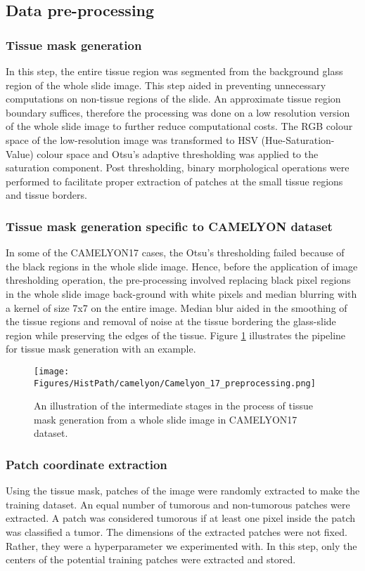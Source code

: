 \documentclass[times,twocolumn,final,authoryear]{tmp}
\begin{document}
\subsection{Data pre-processing}
\label{path_sec:path_datapreprocess}

\subsubsection{Tissue mask generation}
\label{path_sec:tm}
In this step, the entire tissue region was segmented from the background glass region of the whole slide image. This step aided in preventing unnecessary computations on non-tissue regions of the slide. An approximate tissue region boundary suffices, therefore the processing was done on a low resolution version of the whole slide image to further reduce computational costs. The RGB colour space of the low-resolution image was transformed to HSV (Hue-Saturation-Value) colour space and Otsu's adaptive thresholding \citep{otsu1979threshold} was applied to the saturation component. Post thresholding, binary morphological operations were performed to facilitate proper extraction of patches at the small tissue regions and tissue borders.
\subsubsection{Tissue mask generation specific to CAMELYON dataset}
In some of the CAMELYON17 cases, the Otsu's thresholding failed because of the black regions in the whole slide image. Hence, before the application of image thresholding operation, the pre-processing involved replacing black pixel regions in the whole slide image back-ground with white pixels and median blurring with a kernel of size 7x7 on the entire image. Median blur aided in the smoothing of the tissue regions and removal of noise at the tissue bordering the glass-slide region while preserving the edges of the tissue. Figure \ref{path_fig:cm17_tmask} illustrates the pipeline for tissue mask generation with an example.

\begin{figure}
\texttt{[image: Figures/HistPath/camelyon/Camelyon\_17\_preprocessing.png]}
    \caption{An illustration of the intermediate stages in the process of tissue mask generation from a whole slide image in CAMELYON17 dataset.}
    \label{path_fig:cm17_tmask}
\end{figure}

\subsubsection{Patch coordinate extraction}
Using the tissue mask, patches of the image were randomly extracted to make the training dataset. An equal number of tumorous and non-tumorous patches were extracted. A patch was considered tumorous if at least one pixel inside the patch was classified a tumor. The dimensions of the extracted patches were not fixed. Rather, they were a hyperparameter we experimented with. In this step, only the centers of the potential training patches were extracted and stored.
\end{document}
